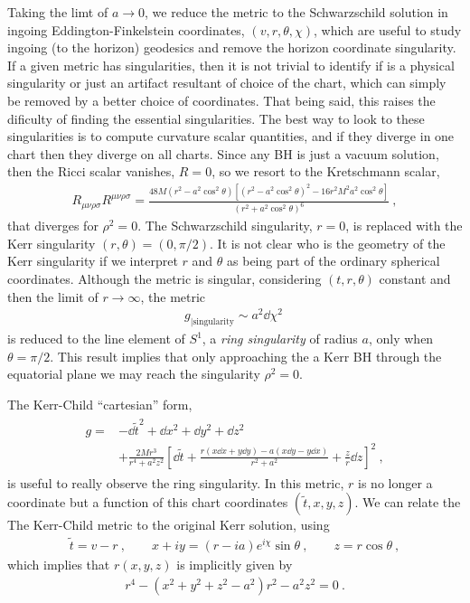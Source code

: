 Taking the limt of $a\to0$, we reduce the metric to the Schwarzschild solution in ingoing Eddington-Finkelstein coordinates, $(v,r,\theta,\chi)$, which are useful to study ingoing (to the horizon) geodesics and remove the horizon coordinate singularity. If a given metric has singularities, then it is not trivial to identify if is a physical singularity or just an artifact resultant of choice of the chart, which can simply be removed by a better choice of coordinates. 
That being said, this raises the dificulty of finding the essential singularities.
The best way to look to these singularities is to compute curvature scalar quantities, and if they diverge in one chart then they diverge on all charts.
Since any BH is just a vacuum solution, then the Ricci scalar vanishes, $R=0$, so we resort to the Kretschmann scalar,
\begin{align}
    R_{\mu\nu\rho\sigma} R^{\mu\nu\rho\sigma} = \frac{48 M (r^2 - a^2\cos^2\theta) \left[ (r^2 - a^2\cos^2\theta) ^2 - 16 r^2 M^2 a^2\cos^2\theta \right] }{(r^2 + a^2\cos^2\theta)^6} ~,
    \label{eq2:KerrKretschmann}
\end{align}
that diverges for $\rho^2=0$.
The Schwarzschild singularity, $r=0$, is replaced with the Kerr singularity $(r,\theta)=(0,\pi/2)$. It is not clear who is the geometry of the Kerr singularity if we interpret $r$ and $\theta$ as being part of the ordinary spherical coordinates. Although the metric is singular, considering $(t,r,\theta)$ constant and then the limit of $r\to\infty$, the metric
\begin{align}
    g_{\rvert\mathrm{singularity}} \sim a^2 \dd \chi^2 ~
    \label{eq2:KerrKretschmann}
\end{align}
is reduced to the line element of $S^1$, a \emph{ring singularity} of radius $a$, only when $\theta=\pi/2$. This result implies that only approaching the a Kerr BH through the equatorial plane we may reach the singularity $\rho^2=0$. 

The Kerr-Child ``cartesian'' form, 
\begin{align}
    \begin{split}
        g = &- \dd \tilde{t}^2 + \dd x^2 + \dd y^2 + \dd z^2 \\
        &+ \frac{2 M r^3}{r^4 + a^2 z^2} \left[ \dd \tilde{t} + \frac{r (x \dd x + y \dd y) - a (x \dd y - y \dd x)}{r^2+a^2} + \frac{z}{r} \dd z \right]^2 ~,
    \end{split}
    \label{eq2:KerrChild}
\end{align}
is useful to really observe the ring singularity. In this metric, $r$ is no longer a coordinate but a function of this chart coordinates $(\tilde{t},x,y,z)$. We can relate the The Kerr-Child metric to the original Kerr solution, using
\begin{align}
    \tilde{t} = v - r ~, \qquad x+ i y = (r -i a) e^{i \chi} \sin\theta ~,\qquad z=r\cos\theta ~,
    \label{eq2:InEFtoKChild}
\end{align}
which implies that $r(x,y,z)$ is implicitly given by
\begin{align}
    r^4 - (x^2+y^2+z^2-a^2)r^2 -a^2 z^2 = 0 ~.
    \label{eq2:rConditionKChild}
\end{align}

